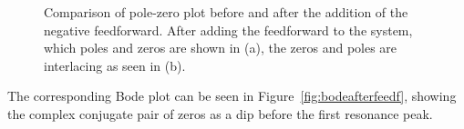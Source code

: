 \begin{figure}[h!]
  \centering %
  \qquad
  \caption{\label{fig:negfeedpzmap} Comparison of pole-zero plot before and after the addition of the negative feedforward. After adding the feedforward to the system, which poles and zeros are shown in (a), the zeros and poles are interlacing as seen in (b).}
\end{figure}

The corresponding Bode plot can be seen in Figure~\ref{fig:bodeafterfeedf}, showing the complex conjugate pair of zeros as a dip before the first resonance peak.

